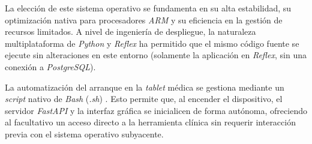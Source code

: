 La elección de este sistema operativo se fundamenta en su alta estabilidad, su optimización nativa para procesadores \textit{ARM} y su eficiencia en la gestión de recursos limitados. A nivel de ingeniería de despliegue, la naturaleza multiplataforma de \textit{Python} y \textit{Reflex} ha permitido que el mismo código fuente se ejecute sin alteraciones en este entorno (solamente la aplicación en \textit{Reflex}, sin una conexión a \textit{PostgreSQL}). 

La automatización del arranque en la \textit{tablet} médica se gestiona mediante un \textit{script} nativo de \textit{Bash} (\textit{.sh}) \cite{Bash}. Esto permite que, al encender el dispositivo, el servidor \textit{FastAPI} y la interfaz gráfica se inicialicen de forma autónoma, ofreciendo al facultativo un acceso directo a la herramienta clínica sin requerir interacción previa con el sistema operativo subyacente.









